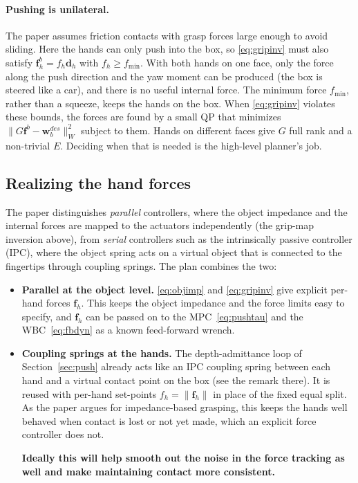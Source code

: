 \documentclass[11pt]{article}
\theoremstyle{remark}
\theoremstyle{definition}
\newcommand{\f}{\bm{f}}
\begin{document}
\paragraph{Pushing is unilateral.} The paper assumes friction contacts with grasp forces large enough to avoid sliding.
Here the hands can only push into the box, so \eqref{eq:gripinv} must also satisfy $\bm f_h^b=f_h\bm d_h$ with
$f_h\ge f_{\min}$. With both hands on one face, only the force along the push direction and the yaw moment can be
produced (the box is steered like a car), and there is no useful internal force. The minimum force $f_{\min}$, rather
than a squeeze, keeps the hands on the box. When \eqref{eq:gripinv} violates these bounds, the forces are found by a
small QP that minimizes $\|G\bm f^b-\bm w_b^{des}\|_W^2$ subject to them. Hands on different faces give $G$ full
rank and a non-trivial $E$. Deciding when that is needed is the high-level planner's job.

\subsection{Realizing the hand forces}
The paper distinguishes \emph{parallel} controllers, where the object impedance and the internal forces are mapped
to the actuators independently (the grip-map inversion above), from \emph{serial} controllers such as the
intrinsically passive controller (IPC), where the object spring acts on a virtual object that is connected to the
fingertips through coupling springs. The plan combines the two:
\begin{itemize}
  \item \textbf{Parallel at the object level.} \eqref{eq:objimp} and \eqref{eq:gripinv} give explicit per-hand forces
        $\f_h$. This keeps the object impedance and the force limits easy to specify, and $\f_h$ can be passed on to the
        MPC~\eqref{eq:pushtau} and the WBC~\eqref{eq:fbdyn} as a known feed-forward wrench.
  \item \textbf{Coupling springs at the hands.} The depth-admittance loop of Section~\ref{sec:push} already acts like an
        IPC coupling spring between each hand and a virtual contact point on the box (see the remark there). It is
        reused with per-hand set-points $f_h=\|\f_h\|$ in place of the fixed equal split. As the paper argues for
        impedance-based grasping, this keeps the hands well behaved when contact is lost or not yet made, which an
        explicit force controller does not.

\textbf{Ideally this will help smooth out the noise in the force tracking as well and make maintaining contact more consistent. }
\end{itemize}
\end{document}
